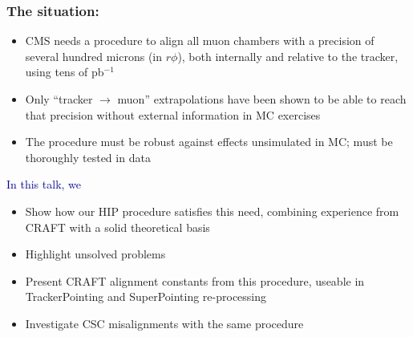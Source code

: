 \documentclass[compress]{beamer}
\begin{document}
\begin{frame}
\frametitle{The situation:}
\begin{itemize}
\item CMS needs a procedure to align all muon chambers with a
  precision of several hundred microns (in $r\phi$), both internally
  and relative to the tracker, using tens of pb$^{-1}$
\item Only ``tracker $\to$ muon'' extrapolations have been shown to be
  able to reach that precision without external information in MC exercises
\item The procedure must be robust against effects unsimulated in MC;
  must be thoroughly tested in data
\end{itemize}

\vfill
\hspace{-0.83 cm} \textcolor{darkblue}{\Large In this talk, we}
\begin{itemize}
\item Show how our HIP procedure satisfies this need, combining
  experience from CRAFT with a solid theoretical basis
\item Highlight unsolved problems
\item Present CRAFT alignment constants from this procedure,
  useable in TrackerPointing and SuperPointing re-processing
\item Investigate CSC misalignments with the same procedure
\end{itemize}
\end{frame}
\end{document}
